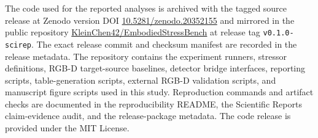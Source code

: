 The code used for the reported analyses is archived with the tagged source release at Zenodo version DOI \href{https://doi.org/10.5281/zenodo.20352155}{10.5281/zenodo.20352155} and mirrored in the public repository \href{https://github.com/KleinChen42/EmbodiedStressBench}{KleinChen42/EmbodiedStressBench} at release tag \texttt{v0.1.0-scirep}. The exact release commit and checksum manifest are recorded in the release metadata. The repository contains the experiment runners, stressor definitions, RGB-D target-source baselines, detector bridge interfaces, reporting scripts, table-generation scripts, external RGB-D validation scripts, and manuscript figure scripts used in this study. Reproduction commands and artifact checks are documented in the reproducibility README, the Scientific Reports claim-evidence audit, and the release-package metadata. The code release is provided under the MIT License.
